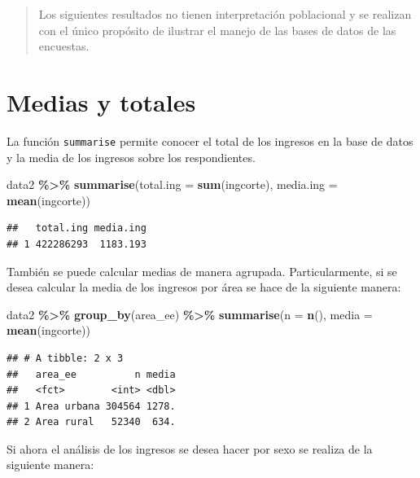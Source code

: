 \documentclass[
  12pt,
]{book}
\newenvironment{Shaded}{\begin{snugshade}}{\end{snugshade}}
\newcommand{\AttributeTok}[1]{\textcolor[rgb]{0.13,0.29,0.53}{#1}}
\newcommand{\FunctionTok}[1]{\textcolor[rgb]{0.13,0.29,0.53}{\textbf{#1}}}
\newcommand{\NormalTok}[1]{#1}
\newcommand{\SpecialCharTok}[1]{\textcolor[rgb]{0.81,0.36,0.00}{\textbf{#1}}}
\begin{document}
\begin{quote}
Los siguientes resultados no tienen interpretación poblacional y se realizan con el único propósito de ilustrar el manejo de las bases de datos de las encuestas.
\end{quote}

\section{Medias y totales}\label{medias-y-totales}

La función \texttt{summarise} permite conocer el total de los ingresos en la base de datos y la media de los ingresos sobre los respondientes.

\begin{Shaded}
\begin{Highlighting}[]
\NormalTok{data2 }\SpecialCharTok{\%\textgreater{}\%} \FunctionTok{summarise}\NormalTok{(}\AttributeTok{total.ing =} \FunctionTok{sum}\NormalTok{(ingcorte),}
                    \AttributeTok{media.ing =} \FunctionTok{mean}\NormalTok{(ingcorte))}
\end{Highlighting}
\end{Shaded}

\begin{verbatim}
##   total.ing media.ing
## 1 422286293  1183.193
\end{verbatim}

También se puede calcular medias de manera agrupada. Particularmente, si se desea calcular la media de los ingresos por área se hace de la siguiente manera:

\begin{Shaded}
\begin{Highlighting}[]
\NormalTok{data2 }\SpecialCharTok{\%\textgreater{}\%} \FunctionTok{group\_by}\NormalTok{(area\_ee) }\SpecialCharTok{\%\textgreater{}\%}
  \FunctionTok{summarise}\NormalTok{(}\AttributeTok{n =} \FunctionTok{n}\NormalTok{(),}
            \AttributeTok{media =} \FunctionTok{mean}\NormalTok{(ingcorte))}
\end{Highlighting}
\end{Shaded}

\begin{verbatim}
## # A tibble: 2 x 3
##   area_ee          n media
##   <fct>        <int> <dbl>
## 1 Area urbana 304564 1278.
## 2 Area rural   52340  634.
\end{verbatim}

Si ahora el análisis de los ingresos se desea hacer por sexo se realiza de la siguiente manera:
\end{document}
